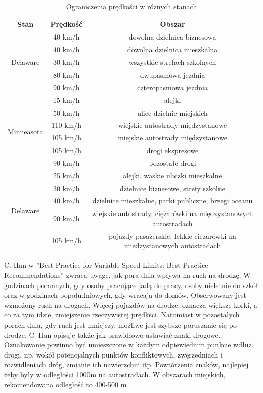 \begin{table}[ht]
\centering
\caption{Ograniczenia prędkości w różnych stanach}
\label{my-label}
\begin{tabular}{|c|c|c|}
\hline
\textbf{Stan}                    & \textbf{Prędkość} & \textbf{Obszar} \\ \hline
\multirow{5}{*}{Delaware}   & 40 km/h & dowolna dzielnica biznesowa \\ \cline{2-3}
& 40 km/h & dowolna dzielnica mieszkalna \\ \cline{2-3}
& 30 km/h & wszystkie strefach szkolnych \\ \cline{2-3}
& 80 km/h & dwupasmowa jezdnia \\ \cline{2-3}
& 90 km/h & czteropasmowa jezdnia \\ \hline

\multirow{6}{*}{Minneasota}   & 15 km/h & alejki \\ \cline{2-3}
& 50 km/h & ulice dzielnic miejskich \\ \cline{2-3}
& 110 km/h & wiejskie autostrady międzystanowe \\ \cline{2-3}
& 105 km/h & miejskie autostrady międzystanowe \\ \cline{2-3}
& 105 km/h & drogi ekspresowe \\ \cline{2-3}
& 90 km/h & pozostałe drogi \\ \hline

\multirow{5}{*}{Delaware}   & 25 km/h & alejki, wąskie uliczki mieszkalne  \\ \cline{2-3}
& 30 km/h & dzielnice biznesowe, strefy szkolne \\ \cline{2-3}
& 40 km/h & dzielnice mieszkalne, parki publiczne, brzegi oceanu \\ \cline{2-3}
& 90 km/h & wiejskie autostrady, ciężarówki na międzystanowych autostradach \\ \cline{2-3}
& 105 km/h & pojazdy pasażerskie, lekkie cięzarówki na miedzystanowych autostradach\\ \hline
\end{tabular}
\end{table} 


C. Han w ''Best Practice for Variable Speed Limits: Best Practice Recommendations'' zwraca uwagę, jak pora dnia wpływa na ruch na drodzę. W godzinach porannych, gdy osoby pracujące jadą do pracy, osoby nieletnie do szkół oraz w godzinach popołudniowych, gdy wracają do domów. Obserwowany jest wzmożony ruch na drogach. Więcej pojazdów na drodze, oznacza większe korki, a co za tym idzie, zmiejszenie rzeczywistej prędkści. Natomiast w pozostałych porach dnia, gdy ruch jest mniejszy, możliwe jest szybsze poruszanie się po drodze. C. Han opisuje także jak prawidłowo ustawiać znaki drogowe. Oznakowanie powinno być umieszczone w każdym odpiewiednim punkcie wdłuż drogi, np. wokół potencjalnych punktów konfliktowych, zwęrzedniach i rozwidleniach dróg, zmianie ich nawierzchni itp. Powtórzenia znaków, najlepiej żeby były w odległości 1000m na autostradach. W obszarach miejskich, rekomendowana odległość to 400-500 m
 


